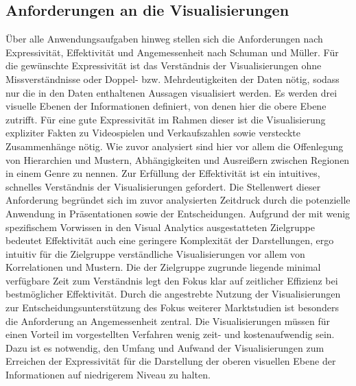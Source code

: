 \documentclass[usegeometry=true]{scrartcl}
\begin{document}
\subsection{Anforderungen an die Visualisierungen}
Über alle Anwendungsaufgaben hinweg stellen sich die Anforderungen nach Expressivität, Effektivität und Angemessenheit nach Schuman und Müller.\cite[9ff.]{Schumann.2000}
Für die gewünschte Expressivität ist das Verständnis der Visualisierungen ohne Missverständnisse oder Doppel- bzw. Mehrdeutigkeiten der Daten nötig, 
sodass nur die in den Daten enthaltenen Aussagen visualisiert werden. 
Es werden drei visuelle Ebenen der Informationen definiert, von denen hier die obere Ebene zutrifft.\cite{Bertin.1982}
Für eine gute Expressivität im Rahmen dieser ist die Visualisierung expliziter Fakten zu Videospielen und Verkaufszahlen sowie versteckte Zusammenhänge nötig. 
Wie zuvor analysiert sind hier vor allem die Offenlegung von Hierarchien und Mustern, Abhängigkeiten und Ausreißern zwischen Regionen in einem Genre zu nennen.
Zur Erfüllung der Effektivität ist ein intuitives, schnelles Verständnis der Visualisierungen gefordert.
Die Stellenwert dieser Anforderung begründet sich im zuvor analysierten Zeitdruck durch die potenzielle Anwendung in Präsentationen sowie der Entscheidungen.
Aufgrund der mit wenig spezifischem Vorwissen in den Visual Analytics ausgestatteten Zielgruppe 
bedeutet Effektivität auch eine geringere Komplexität der Darstellungen, ergo intuitiv für die Zielgruppe verständliche Visualisierungen 
vor allem von Korrelationen und Mustern.
Die der Zielgruppe zugrunde liegende minimal verfügbare Zeit zum Verständnis legt den Fokus klar auf zeitlicher Effizienz bei bestmöglicher Effektivität.
Durch die angestrebte Nutzung der Visualisierungen zur Entscheidungsunterstützung des Fokus weiterer Marktstudien ist besonders die Anforderung an Angemessenheit zentral. 
Die Visualisierungen müssen für einen Vorteil im vorgestellten Verfahren wenig zeit- und kostenaufwendig sein. 
Dazu ist es notwendig, den Umfang und Aufwand der Visualisierungen zum Erreichen der Expressivität für die Darstellung der oberen visuellen Ebene der Informationen 
auf niedrigerem Niveau zu halten.
\end{document}
